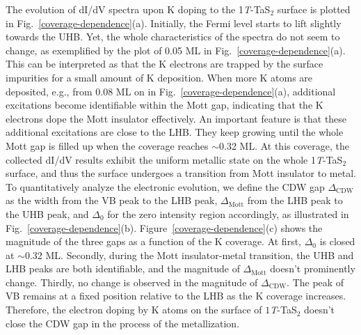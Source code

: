 \documentclass[aps,prl,reprint,groupedaddress,showpacs,amsfonts,amsmath,amssymb,superscriptaddress]{revtex4-1}
\begin{document}
The evolution of dI/dV spectra upon K doping to the 1\emph{T}-TaS$_{2}$ surface is plotted in Fig.~\ref{coverage-dependence}(a). Initially, the Fermi level starts to lift slightly towards the UHB. Yet, the whole characteristics of the spectra do not seem to change, as exemplified by the plot of 0.05 ML in Fig.~\ref{coverage-dependence}(a). This can be interpreted as that the K electrons are trapped by the surface impurities for a small amount of K deposition. When more K atoms are deposited, e.g., from 0.08 ML on in Fig.~\ref{coverage-dependence}(a), additional excitations become identifiable within the Mott gap, indicating that the K electrons dope the Mott insulator effectively.  An important feature is that these additional excitations are close to the LHB.
They keep growing until the whole Mott gap is filled up when the coverage reaches $\sim$0.32 ML. At this coverage, the collected dI/dV results  exhibit the uniform metallic state on the whole 1\emph{T}-TaS$_{2}$ surface, and thus the surface undergoes a transition from Mott insulator to metal. To quantitatively analyze the electronic evolution, we define the CDW gap $\Delta_{\mathrm{CDW}}$ as the width from the VB peak to the LHB peak, $\Delta_{\mathrm{Mott}}$ from the LHB peak to the UHB peak, and $\Delta_{0}$ for the zero intensity region accordingly, as illustrated in Fig.~\ref{coverage-dependence}(b). Figure~\ref{coverage-dependence}(c) shows the magnitude of the three gaps as a function of the K coverage. At first, $\Delta_{0}$ is closed at $\sim$0.32 ML. Secondly, during the Mott insulator-metal transition, the UHB and LHB peaks are both identifiable, and the magnitude of $\Delta_{\mathrm{Mott}}$ doesn't prominently change. Thirdly, no change is observed in the magnitude of $\Delta_{\mathrm{CDW}}$. The peak of VB remains at a fixed position relative to the LHB as the K coverage increases. Therefore, the electron doping by K atoms on the surface of $1$\emph{T}-TaS$_{2}$ doesn't close the CDW gap in the process of the metallization.
\end{document}
